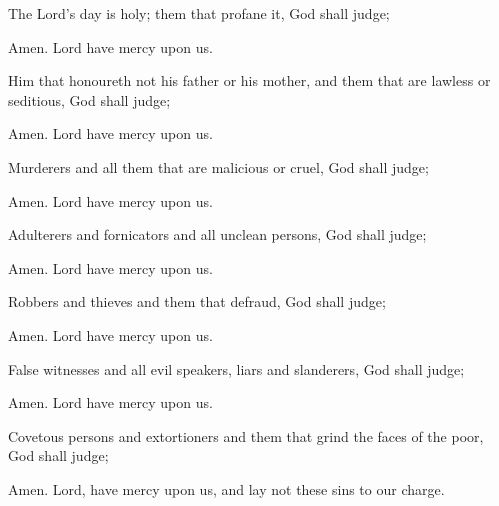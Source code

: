 The Lord’s day is holy; them that profane it, God shall judge;

\R Amen.  Lord have mercy upon us.

Him that honoureth not his father or his mother, and them that are lawless or seditious, God shall judge;

\R Amen.  Lord have mercy upon us.

Murderers and all them that are malicious or cruel, God shall judge;

\R Amen.  Lord have mercy upon us.

Adulterers and fornicators and all unclean persons, God shall judge;

\R Amen.  Lord have mercy upon us.

Robbers and thieves and them that defraud, God shall judge;

\R Amen.  Lord have mercy upon us.

False witnesses and all evil speakers, liars and slanderers, God shall judge;

\R Amen.  Lord have mercy upon us.

Covetous persons and extortioners and them that grind the faces of the poor, God shall judge;

\R Amen. Lord, have mercy upon us, and lay not these sins to our charge.


\centerline{}

